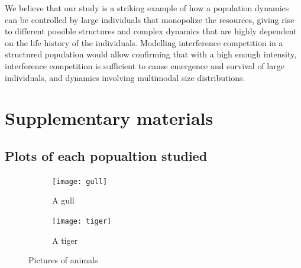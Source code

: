 We believe that our study is a striking example of how a population dynamics can
be controlled by large individuals that monopolize the resources, giving rise to
different possible structures and complex dynamics that are highly dependent on
the life history of the individuals. Modelling interference competition in a
structured population would allow confirming that with a high enough intensity,
interference competition is sufficient to cause emergence and survival of large
individuals, and dynamics involving multimodal size distributions.

\section{Supplementary materials}

\subsection{Plots of each popualtion studied}
\begin{figure}
        \centering
        \begin{subfigure}[b]{0.5\textwidth}
                \texttt{[image: gull]}
                \caption{A gull}
                \label{fig:gull}
        \end{subfigure}%
       \begin{subfigure}[b]{0.5\textwidth}
                \texttt{[image: tiger]}
                \caption{A tiger}
                \label{fig:tiger}
        \end{subfigure}
       
       \caption{Pictures of animals}\label{fig:animals}
\end{figure}
